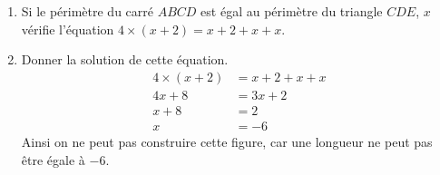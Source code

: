 \documentclass[noheader]{évaluation}
\begin{document}
\begin{exercice}
	\begin{enumerate}
		\item Si le périmètre du carré $ABCD$ est égal au périmètre du triangle $CDE$, $x$ vérifie l'équation $4 × (x + 2) = x + 2 + x + x$.
		\item Donner la solution de cette équation.
		      \begin{align*}
			      4 × (x + 2) & = x + 2 + x + x \\
			      4x + 8      & = 3x + 2        \\
			      x + 8       & = 2             \\
			      x           & = -6
		      \end{align*}
		      Ainsi on ne peut pas construire cette figure, car une longueur ne peut pas être égale à $-6$.
	\end{enumerate}
\end{exercice}
\end{document}
